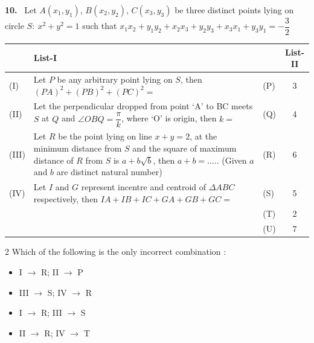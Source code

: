 \documentclass[10pt]{extarticle}
\newcommand{\qn}[1]{\par\smallskip\noindent\textbf{#1.}~}
\newenvironment{qoptions}{\begin{itemize}[leftmargin=1.8em,itemsep=1pt,topsep=2pt,label={}]}{\end{itemize}}
\newcommand{\opt}[2]{\item[(#1)] #2}
\begin{document}
\noindent\begin{minipage}{\textwidth}
\qn{10} Let $A(x_1,y_1)$, $B(x_2,y_2)$, $C(x_3,y_3)$ be three distinct points lying on circle $S:\ x^2+y^2=1$ such that $x_1x_2+y_1y_2+x_2x_3+y_2y_3+x_3x_1+y_3y_1=-\dfrac32$\par\smallskip
\begin{center}\small\renewcommand{\arraystretch}{1.25}\setlength{\tabcolsep}{4pt}
\begin{tabular}{|l|p{10.5cm}|l|c|}
\hline & \textbf{List-I} & & \textbf{List-II} \\\hline
(I) & Let $P$ be any arbitrary point lying on $S$, then $(PA)^2+(PB)^2+(PC)^2=$ & (P) & 3 \\\hline
(II) & Let the perpendicular dropped from point `A' to BC meets $S$ at $Q$ and $\angle OBQ=\dfrac{\pi}{k}$, where `O' is origin, then $k=$ & (Q) & 4 \\\hline
(III) & Let $R$ be the point lying on line $x+y=2$, at the minimum distance from $S$ and the square of maximum distance of $R$ from $S$ is $a+b\sqrt b$, then $a+b=\ldots..$ (Given $a$ and $b$ are distinct natural number) & (R) & 6 \\\hline
(IV) & Let $I$ and $G$ represent incentre and centroid of $\Delta ABC$ respectively, then $IA+IB+IC+GA+GB+GC=$ & (S) & 5 \\\hline
 &  & (T) & 2 \\\hline
 &  & (U) & 7 \\\hline
\end{tabular}
\end{center}
\end{minipage}
\begin{multicols}{2}
Which of the following is the only incorrect combination :
\begin{qoptions}
\opt{A}{I $\to$ R; II $\to$ P}
\opt{B}{III $\to$ S; IV $\to$ R}
\opt{C}{I $\to$ R; III $\to$ S}
\opt{D}{II $\to$ R; IV $\to$ T}
\end{qoptions}
\end{multicols}
\end{document}
